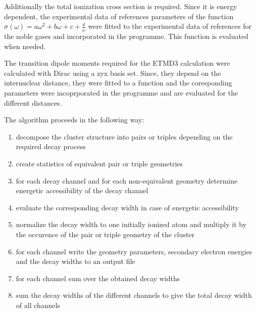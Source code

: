 Additionally the total ionization cross section is required. Since it is
energy dependent, the experimental data of references \cite{}
parameters of the function
$\sigma(\omega) = a\omega^2 + b\omega + c + \frac{d}{\omega}$ were fitted
to the experimental data of references \cite{West76,West78}
for the noble gases and incorporated in the programme. This function is evaluated
when needed.

The transition dipole moments required for the ETMD3 calculation were
calculated with Dirac using a zyx basis set. Since, they depend on the
internuclear distance, they were fitted to a function and the coresponding
parameters were incoprporated in the programme and are evaluated for the
different distances.

The algorithm proceeds in the following way:
\begin{enumerate}
 \item decompose the cluster structure into pairs or triples depending
       on the required decay process
 \item create statistics of equivalent pair or triple geometries
 \item for each decay channel and for each non-equivalent geometry
       determine energetic accessibility of the decay channel
 \item evaluate the corresponding decay width in case of energetic accessibility
 \item normalize the decay width to one initially ionized atom and multiply
       it by the occurence of the pair or triple geometry of the cluster
 \item for each channel write the geometry parameters, secondary electron energies
       and the decay widths to an output file
 \item for each channel sum over the obtained decay widths
 \item sum the decay widths of the different channels to give the total decay
       width of all channels
\end{enumerate}

